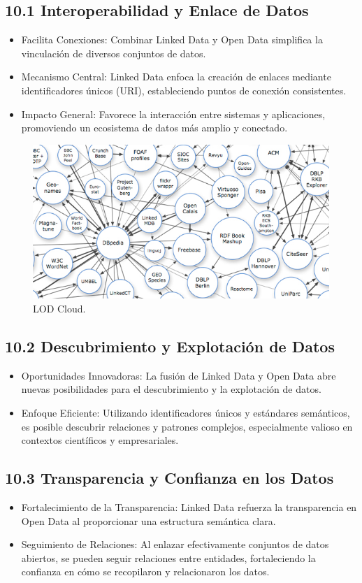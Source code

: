 \documentclass[11pt]{report}
\begin{document}
		\subsection*{10.1 Interoperabilidad y Enlace de Datos}
\begin{itemize}
  \item Facilita Conexiones: Combinar Linked Data y Open Data simplifica la vinculación de diversos conjuntos de datos.
  \item Mecanismo Central: Linked Data enfoca la creación de enlaces mediante identificadores únicos (URI), estableciendo puntos de conexión consistentes.
  \item Impacto General: Favorece la interacción entre sistemas y aplicaciones, promoviendo un ecosistema de datos más amplio y conectado.
\end{itemize}
\begin{figure}[H]
	\centering
	\includegraphics[scale=0.4]{../img/lod.jpg}
	\caption{LOD Cloud.}
	\label{fig:lod}
\end{figure}

\subsection*{10.2 Descubrimiento y Explotación de Datos}
\begin{itemize}
  \item Oportunidades Innovadoras: La fusión de Linked Data y Open Data abre nuevas posibilidades para el descubrimiento y la explotación de datos.
  \item Enfoque Eficiente: Utilizando identificadores únicos y estándares semánticos, es posible descubrir relaciones y patrones complejos, especialmente valioso en contextos científicos y empresariales.
\end{itemize}
\subsection*{10.3 Transparencia y Confianza en los Datos}
\begin{itemize}
  \item Fortalecimiento de la Transparencia: Linked Data refuerza la transparencia en Open Data al proporcionar una estructura semántica clara.
  \item Seguimiento de Relaciones: Al enlazar efectivamente conjuntos de datos abiertos, se pueden seguir relaciones entre entidades, fortaleciendo la confianza en cómo se recopilaron y relacionaron los datos.
\end{itemize}
\end{document}
